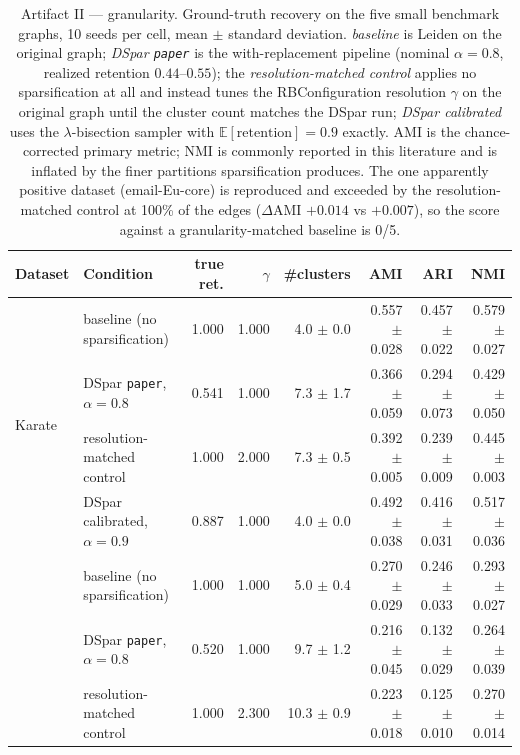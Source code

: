 \begin{table}[t]
\centering
\setlength{\tabcolsep}{5pt}
\caption{Artifact II --- granularity. Ground-truth recovery on the five small benchmark graphs,
10 seeds per cell, mean $\pm$ standard deviation. \emph{baseline} is Leiden on the original graph;
\emph{DSpar \texttt{paper}} is the with-replacement pipeline (nominal $\alpha=0.8$,
realized retention $0.44$--$0.55$); the \emph{resolution-matched control} applies no sparsification
at all and instead tunes the RBConfiguration resolution $\gamma$ on the original graph until the
cluster count matches the DSpar run; \emph{DSpar calibrated} uses the $\lambda$-bisection sampler
with $\mathbb{E}[\text{retention}]=0.9$ exactly. AMI is the chance-corrected primary metric; NMI is
commonly reported in this literature and is inflated by the finer partitions sparsification produces. The one
apparently positive dataset (email-Eu-core) is reproduced and exceeded by the resolution-matched
control at 100\% of the edges ($\Delta$AMI $+0.014$ vs $+0.007$), so the score against a
granularity-matched baseline is 0/5.}
\label{tab:gt_recheck}
\footnotesize
\begin{tabular}{llrrrrrr}
\toprule
Dataset & Condition & true ret. & $\gamma$ & \#clusters & AMI & ARI & NMI \\
\midrule
\multirow{4}{*}{Karate} & baseline (no sparsification) & 1.000 & 1.000 & 4.0 $\pm$ 0.0 & 0.557 $\pm$ 0.028 & 0.457 $\pm$ 0.022 & 0.579 $\pm$ 0.027 \\
 & DSpar \texttt{paper}, $\alpha=0.8$ & 0.541 & 1.000 & 7.3 $\pm$ 1.7 & 0.366 $\pm$ 0.059 & 0.294 $\pm$ 0.073 & 0.429 $\pm$ 0.050 \\
 & resolution-matched control & 1.000 & 2.000 & 7.3 $\pm$ 0.5 & 0.392 $\pm$ 0.005 & 0.239 $\pm$ 0.009 & 0.445 $\pm$ 0.003 \\
 & DSpar calibrated, $\alpha=0.9$ & 0.887 & 1.000 & 4.0 $\pm$ 0.0 & 0.492 $\pm$ 0.038 & 0.416 $\pm$ 0.031 & 0.517 $\pm$ 0.036 \\
\addlinespace[2pt]
\multirow{4}{*}{Dolphins$^{\dagger}$} & baseline (no sparsification) & 1.000 & 1.000 & 5.0 $\pm$ 0.4 & 0.270 $\pm$ 0.029 & 0.246 $\pm$ 0.033 & 0.293 $\pm$ 0.027 \\
 & DSpar \texttt{paper}, $\alpha=0.8$ & 0.520 & 1.000 & 9.7 $\pm$ 1.2 & 0.216 $\pm$ 0.045 & 0.132 $\pm$ 0.029 & 0.264 $\pm$ 0.039 \\
 & resolution-matched control & 1.000 & 2.300 & 10.3 $\pm$ 0.9 & 0.223 $\pm$ 0.018 & 0.125 $\pm$ 0.010 & 0.270 $\pm$ 0.014 \\

\end{tabular}
\end{table}

